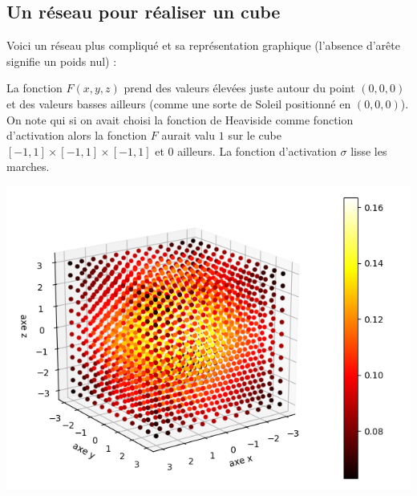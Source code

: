 \documentclass[11pt,class=report,crop=false]{standalone}
\begin{document}
\subsection{Un réseau pour réaliser un cube}



Voici un réseau plus compliqué et sa représentation graphique (l'absence d'arête signifie un poids nul) :


La fonction $F(x,y,z)$ prend des valeurs élevées juste autour du point $(0,0,0)$ et des valeurs basses ailleurs (comme une sorte de Soleil positionné en $(0,0,0)$). On note qui si on avait choisi la fonction de Heaviside comme fonction d'activation alors la fonction $F$ aurait valu $1$ sur le cube $[-1,1]\times [-1,1]\times[-1,1]$ et $0$ ailleurs. La fonction d'activation $\sigma$ \og{}lisse\fg{} les marches.


\begin{center}
\includegraphics[scale=\myscale,scale=0.7]{figures/pythontf-3var-02}
\end{center}
\end{document}

